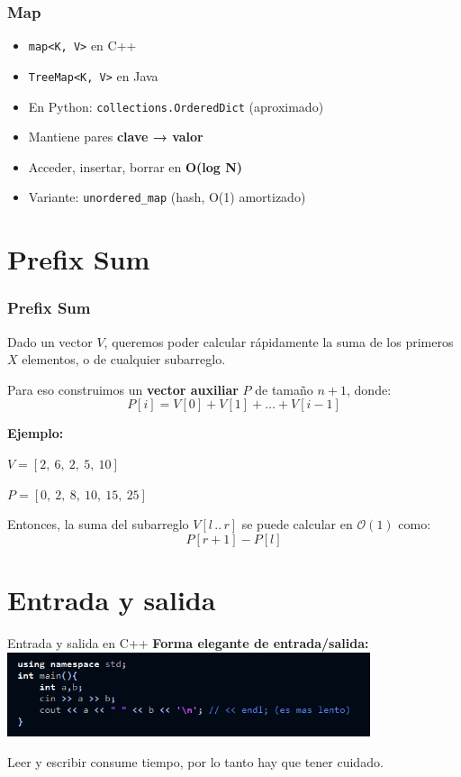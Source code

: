 \documentclass{beamer}
\begin{document}
\begin{frame}
  \frametitle{Map}
  \begin{itemize}
    \item \texttt{map<K, V>} en C++
    \item \texttt{TreeMap<K, V>} en Java
    \item En Python: \texttt{collections.OrderedDict} (aproximado)
    \item Mantiene pares \textbf{clave → valor}
    \item Acceder, insertar, borrar en \textbf{O(log N)}
    \item Variante: \texttt{unordered\_map} (hash, O(1) amortizado)
  \end{itemize}
\end{frame}


\section{Prefix Sum}
\begin{frame}
  \frametitle{Prefix Sum}

  Dado un vector $V$, queremos poder calcular rápidamente la suma de los primeros $X$ elementos, o de cualquier subarreglo.

  \vspace{0.3cm}
  Para eso construimos un \textbf{vector auxiliar} $P$ de tamaño $n+1$, donde:
  \[
    P[i] = V[0] + V[1] + \dots + V[i-1]
  \]

  \vspace{0.3cm}
  \textbf{Ejemplo:}  

  $V = [2,\ 6,\ 2,\ 5,\ 10]$  

  $P = [0,\ 2,\ 8,\ 10,\ 15,\ 25]$

  \vspace{0.3cm}
  Entonces, la suma del subarreglo $V[l\,..\,r]$ se puede calcular en $\mathcal{O}(1)$ como:
  \[
    P[r+1] - P[l]
  \]
\end{frame}

\section{Entrada y salida}

\begin{frame}{Entrada y salida en C++}
  \textbf{Forma elegante de entrada/salida:}
  \includegraphics[width=0.8\textwidth,keepaspectratio]{fotos/cin.png}

  \vspace{0.2cm}
  Leer y escribir consume tiempo, por lo tanto hay que tener cuidado.
\end{frame}
\end{document}
